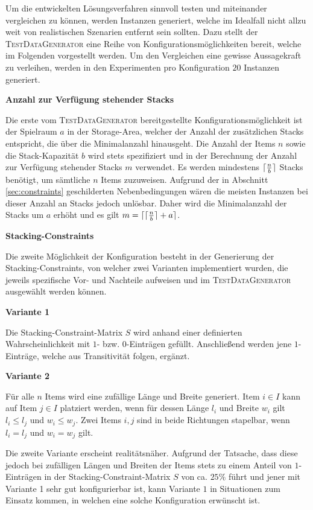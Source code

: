 Um die entwickelten Lösungsverfahren sinnvoll testen und miteinander vergleichen zu können,
werden Instanzen generiert, welche im Idealfall nicht allzu weit von realistischen Szenarien entfernt
sein sollten. Dazu stellt der \textsc{TestDataGenerator} eine Reihe von Konfigurationsmöglichkeiten
bereit, welche im Folgenden vorgestellt werden. Um den Vergleichen eine gewisse Aussagekraft zu verleihen,
werden in den Experimenten pro Konfiguration $20$ Instanzen generiert.

\textbf{Anzahl zur Verfügung stehender Stacks}

Die erste vom \textsc{TestDataGenerator} bereitgestellte Konfigurationsmöglichkeit ist der Spielraum $a$ in der Storage-Area, welcher der Anzahl der zusätzlichen Stacks entspricht, die über die Minimalanzahl hinausgeht.
Die Anzahl der Items $n$ sowie die Stack-Kapazität $b$ wird stets spezifiziert und in der Berechnung der Anzahl zur Verfügung stehender Stacks $m$ verwendet. Es werden mindestens $\lceil\frac{n}{b}\rceil$ Stacks benötigt, um sämtliche $n$ Items zuzuweisen.
Aufgrund der in Abschnitt \ref{sec:constraints} geschilderten Nebenbedingungen wären die meisten Instanzen bei dieser
Anzahl an Stacks jedoch unlösbar. Daher wird die Minimalanzahl der Stacks um $a$ erhöht und es gilt
$m = \lceil\lceil\frac{n}{b}\rceil + a\rceil$.

\pagebreak

\textbf{Stacking-Constraints}

Die zweite Möglichkeit der Konfiguration besteht in der Generierung der Stacking-Constraints,
von welcher zwei Varianten implementiert wurden, die jeweils spezifische Vor- und Nachteile aufweisen
und im \textsc{TestDataGenerator} ausgewählt werden können.

\textbf{Variante 1}

Die Stacking-Constraint-Matrix $S$ wird anhand einer definierten Wahrscheinlichkeit mit $1$- bzw. $0$-Einträgen gefüllt. Anschließend werden jene $1$-Einträge, welche aus Transitivität folgen, ergänzt.

\textbf{Variante 2}

Für alle $n$ Items wird eine zufällige Länge und Breite generiert. Item $i \in I$ kann auf Item $j \in I$
platziert werden, wenn für dessen Länge $l_i$ und Breite $w_i$ gilt $l_i \leq l_j$ und $w_i \leq w_j$.
Zwei Items $i, j$ sind in beide Richtungen stapelbar, wenn $l_i = l_j$ und $w_i = w_j$ gilt.

Die zweite Variante erscheint realitätsnäher. Aufgrund der Tatsache, dass diese jedoch bei zufälligen Längen und
Breiten der Items stets zu einem Anteil von $1$-Einträgen in der Stacking-Constraint-Matrix $S$ von ca. $25\%$ führt
und jener mit Variante 1 sehr gut konfigurierbar ist, kann Variante $1$ in Situationen zum Einsatz kommen,
in welchen eine solche Konfiguration erwünscht ist.

